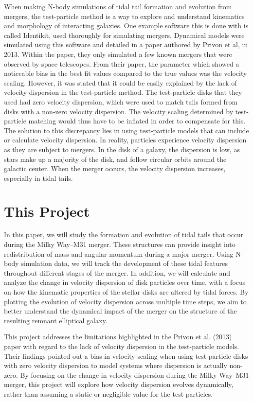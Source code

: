 \documentclass[fleqn,usenatbib]{mnras}
\begin{document}
When making N-body simulations of tidal tail formation and evolution from mergers, the test-particle method is a way to explore and understand kinematics and morphology of interacting galaxies. One example software this is done with is called Identikit, used thoroughly for simulating mergers. Dynamical models were simulated using this software and detailed in a paper authored by Privon et al, in 2013.  Within the paper, they only simulated a few known mergers that were observed by space telescopes. From their paper, the parameter which showed a noticeable bias in the best fit values compared to the true values was the velocity scaling. However, it was stated that it could be easily explained by the lack of velocity dispersion in the test-particle method. The test-particle disks that they used had zero velocity dispersion, which were used to match tails formed from disks with a non-zero velocity dispersion. The velocity scaling determined by test-particle matching would thus have to be inflated in order to compensate for this.  \cite{Privon_2013} The solution to this discrepancy lies in using test-particle models that can include or calculate velocity dispersion. In reality, particles experience velocity dispersion as they are subject to mergers. In the disk of a galaxy, the dispersion is low, as stars make up a majority of the disk, and follow circular orbits around the galactic center. When the merger occurs, the velocity dispersion increases, especially in tidal tails. 


\section{This Project}
In this paper, we will study the formation and evolution of tidal tails that occur during the Milky Way–M31 merger. These structures can provide insight into redistribution of mass and angular momentum during a major merger. Using N-body simulation data, we will track the development of these tidal features throughout different stages of the merger. In addition, we will calculate and analyze the change in velocity dispersion of disk particles over time, with a focus on how the kinematic properties of the stellar disks are altered by tidal forces. By plotting the evolution of velocity dispersion across multiple time steps, we aim to better understand the dynamical impact of the merger on the structure of the resulting remnant elliptical galaxy.

This project addresses the limitations highlighted in the Privon et al. (2013) paper with regard to the lack of velocity dispersion in the test-particle models. Their findings pointed out a bias in velocity scaling when using test-particle disks with zero velocity dispersion to model systems where dispersion is actually non-zero. By focusing on the change in velocity dispersion during the Milky Way–M31 merger, this project will explore how velocity dispersion evolves dynamically, rather than assuming a static or negligible value for the test particles. 
\end{document}
